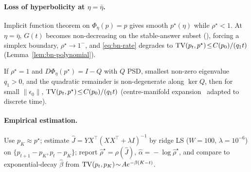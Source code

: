 \paragraph{Loss of hyperbolicity at $\eta\!=\!\bar\eta$.}
Implicit function theorem on $\Phi_\eta(p)\!=\!p$ gives smooth
$p^\star(\eta)$ while $\rho^\star\!<\!1$.  At $\eta\!=\!\bar\eta$,
$G(t)$ becomes non-decreasing on the stable-answer subset
(), forcing a simplex boundary,
$\rho^\star\!\to\!1^-$, and \eqref{eq:bn-rate} degrades to
$\operatorname{TV}(p_t,p^\star)\!\le\!C(p_0)/(q_1 t)$
(Lemma~\ref{lem:bn-polynomial}).

\begin{lemma}
\label{lem:bn-polynomial}
If $\rho^\star\!=\!1$ and $D\Phi_\eta(p^\star)\!=\!I\!-\!Q$ with $Q$
PSD, smallest non-zero eigenvalue $q_1\!>\!0$, and the quadratic
remainder is non-degenerate along $\ker Q$, then for small
$\|\epsilon_0\|$, $\operatorname{TV}(p_t,p^\star)\!\le\!C(p_0)/(q_1 t)$
(centre-manifold expansion~\citep{esponda2016} adapted to discrete
time).
\end{lemma}

\paragraph{Empirical estimation.}
Use $p_K\!\approx\!p^\star$; estimate
$\widehat J\!=\!YX^\top(XX^\top\!+\!\lambda I)^{-1}$ by ridge LS
($W\!=\!100$, $\lambda\!=\!10^{-6}$) on
$\{p_{t+1}\!-\!p_K, p_t\!-\!p_K\}$; report
$\widehat\rho^\star\!=\!\rho(\widehat J)$,
$\widehat\alpha\!=\!-\log\widehat\rho^\star$, and compare to
exponential-decay $\widehat\beta$ from
$\operatorname{TV}(p_t,p_K)\!\sim\!Ae^{-\beta(K-t)}$.

